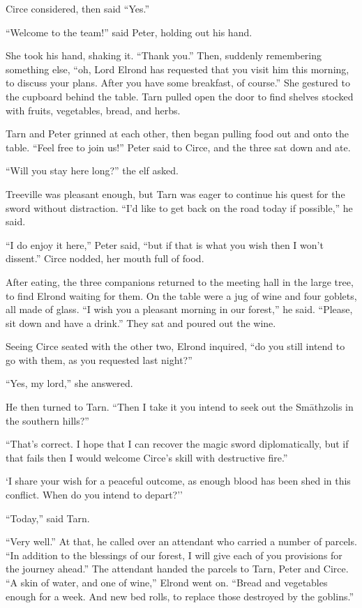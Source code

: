 Circe considered, then said ``Yes.''

``Welcome to the team!'' said Peter, holding out his hand.

She took his hand, shaking it.  ``Thank you.'' Then, suddenly remembering something else, ``oh, Lord Elrond has requested that you visit him this morning, to discuss your plans.  After you have some breakfast, of course.''  She gestured to the cupboard behind the table.  Tarn pulled open the door to find shelves stocked with fruits, vegetables, bread, and herbs.

Tarn and Peter grinned at each other, then began pulling food out and onto the table.  ``Feel free to join us!'' Peter said to Circe, and the three sat down and ate.

``Will you stay here long?'' the elf asked.

Treeville was pleasant enough, but Tarn was eager to continue his quest for the sword without distraction. ``I'd like to get back on the road today if possible,'' he said.

``I do enjoy it here,'' Peter said, ``but if that is what you wish then I won't dissent.''  Circe nodded, her mouth full of food.

After eating, the three companions returned to the meeting hall in the large tree, to find Elrond waiting for them.  On the table were a jug of wine and four goblets, all made of glass.  ``I wish you a pleasant morning in our forest,'' he said.  ``Please, sit down and have a drink.''  They sat and poured out the wine.

Seeing Circe seated with the other two, Elrond inquired, ``do you still intend to go with them, as you requested last night?''

``Yes, my lord,'' she answered.

He then turned to Tarn.  ``Then I take it you intend to seek out the Sm\=athzolis in the southern hills?''

``That's correct.  I hope that I can recover the magic sword diplomatically, but if that fails then I would welcome Circe's skill with destructive fire.''

`I share your wish for a peaceful outcome, as enough blood has been shed in this conflict.  When do you intend to depart?''

``Today,'' said Tarn.

``Very well.''  At that, he called over an attendant who carried a number of parcels.  ``In addition to the blessings of our forest, I will give each of you provisions for the journey ahead.''  The attendant handed the parcels to Tarn, Peter and Circe.  ``A skin of water, and one of wine,'' Elrond went on.  ``Bread and vegetables enough for a week.  And new bed rolls, to replace those destroyed by the goblins.''